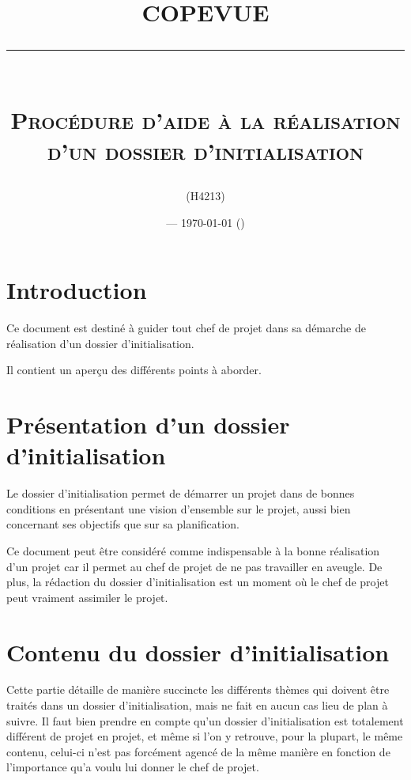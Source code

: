 \documentclass[a4paper, 11pt, draft]{article}
\title{\textbf{COPEVUE}\\
\rule{\textwidth}{1pt}{}\\
\Huge{\textsc{Procédure d'aide à la réalisation d'un dossier d'initialisation}}}
\author{\docauthor{} (H4213)}
\date{\docname{} --- \today{} (\docstatus{})}
\begin{document}
\maketitle


%
%
%
%

\section{Introduction}

Ce document est destiné à guider tout chef de projet dans sa démarche de réalisation d'un dossier d'initialisation.

Il contient un aperçu des différents points à aborder.


\section{Présentation d'un dossier d'initialisation}

Le dossier d'initialisation permet de démarrer un projet dans de bonnes conditions en présentant une vision d'ensemble sur le projet, aussi bien concernant ses objectifs que sur sa planification.


Ce document peut être considéré comme indispensable à la bonne réalisation d'un projet car il permet au chef de projet de ne pas travailler en aveugle. De plus, la rédaction du dossier d'initialisation est un moment où le chef de projet peut vraiment assimiler le projet.

\section{Contenu du dossier d'initialisation}

Cette partie détaille de manière succincte les différents thèmes qui doivent être traités dans un dossier d'initialisation, mais ne fait en aucun cas lieu de plan à suivre. Il faut bien prendre en compte qu'un dossier d'initialisation est totalement différent de projet en projet, et même si l'on y retrouve, pour la plupart, le même contenu, celui-ci n'est pas forcément agencé de la même manière en fonction de l'importance qu'a voulu lui donner le chef de projet.
\end{document}
